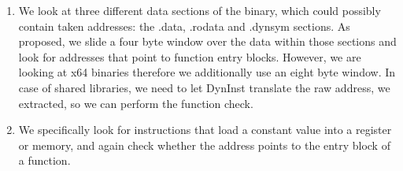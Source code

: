 \begin{enumerate}
\item We look at three different data sections of the binary, which could possibly contain taken addresses: the .data, .rodata and .dynsym sections. As \cite{mingwei:sekar} proposed, we slide a four byte window over the data within those sections and look for addresses that point to function entry blocks. However, we are looking at x64 binaries therefore we additionally use an eight byte window. In case of shared libraries, we need to let DynInst translate the raw address, we extracted, so we can perform the function check.

\item We specifically look for instructions that load a constant value into a register or memory, and again check whether the address points to the entry block of a function.
\end{enumerate}
%
%


